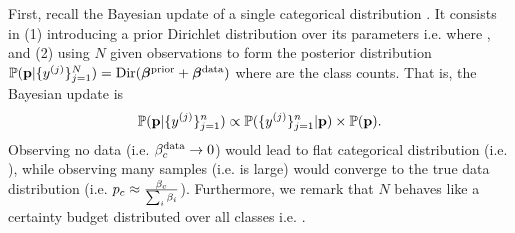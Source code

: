 First, recall the Bayesian update of a single categorical distribution . It consists in (1) introducing a prior Dirichlet distribution over its parameters i.e.  where , and (2) using $N$ given observations  to form the posterior distribution $\mathbb{P}(\mathbf{p}|\{y^{(j)}\}_{j =1}^N)= \text{Dir}(\bm{\beta^\text{prior}} + \bm{\beta^\text{data}})$ where  are the class counts. That is, the Bayesian update is
\begin{equation}
    \begin{aligned}
    \mathbb{P}(\mathbf{p}|\{y^{(j)}\}_{j =1}^n) \propto \mathbb{P}(\{y^{(j)}\}_{j =1}^n|\mathbf{p}) \times \mathbb{P}(\mathbf{p}).
    \end{aligned}
\end{equation}
Observing no data (i.e. $\beta_c^\text{data} \rightarrow 0$) would lead to flat categorical distribution (i.e. ), while observing many samples (i.e.  is large) would converge to the true data distribution (i.e. $p_c \approx \frac{\beta_c}{\sum_i\beta_i}$).
Furthermore, we remark that $N$ behaves like a certainty budget distributed over all classes i.e. .

